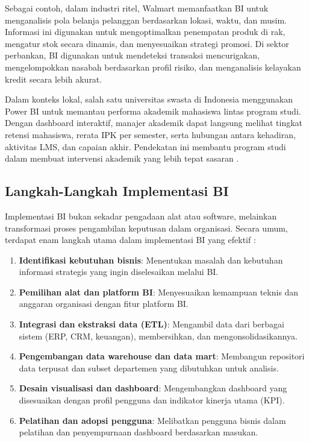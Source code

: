 Sebagai contoh, dalam industri ritel, Walmart memanfaatkan BI untuk menganalisis pola belanja pelanggan berdasarkan lokasi, waktu, dan musim. Informasi ini digunakan untuk mengoptimalkan penempatan produk di rak, mengatur stok secara dinamis, dan menyesuaikan strategi promosi. Di sektor perbankan, BI digunakan untuk mendeteksi transaksi mencurigakan, mengelompokkan nasabah berdasarkan profil risiko, dan menganalisis kelayakan kredit secara lebih akurat.

Dalam konteks lokal, salah satu universitas swasta di Indonesia menggunakan Power BI untuk memantau performa akademik mahasiswa lintas program studi. Dengan dashboard interaktif, manajer akademik dapat langsung melihat tingkat retensi mahasiswa, rerata IPK per semester, serta hubungan antara kehadiran, aktivitas LMS, dan capaian akhir. Pendekatan ini membantu program studi dalam membuat intervensi akademik yang lebih tepat sasaran \cite{marjanovic2010early}.

\subsection{Langkah-Langkah Implementasi BI}

Implementasi BI bukan sekadar pengadaan alat atau software, melainkan transformasi proses pengambilan keputusan dalam organisasi. Secara umum, terdapat enam langkah utama dalam implementasi BI yang efektif \cite{wixom2011success}:

\begin{enumerate}
	\item \textbf{Identifikasi kebutuhan bisnis}: Menentukan masalah dan kebutuhan informasi strategis yang ingin diselesaikan melalui BI.
	\item \textbf{Pemilihan alat dan platform BI}: Menyesuaikan kemampuan teknis dan anggaran organisasi dengan fitur platform BI.
	\item \textbf{Integrasi dan ekstraksi data (ETL)}: Mengambil data dari berbagai sistem (ERP, CRM, keuangan), membersihkan, dan mengonsolidasikannya.
	\item \textbf{Pengembangan data warehouse dan data mart}: Membangun repositori data terpusat dan subset departemen yang dibutuhkan untuk analisis.
	\item \textbf{Desain visualisasi dan dashboard}: Mengembangkan dashboard yang disesuaikan dengan profil pengguna dan indikator kinerja utama (KPI).
	\item \textbf{Pelatihan dan adopsi pengguna}: Melibatkan pengguna bisnis dalam pelatihan dan penyempurnaan dashboard berdasarkan masukan.
\end{enumerate}

